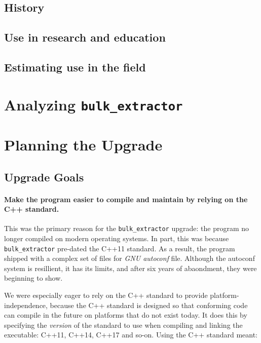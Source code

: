 \documentclass[5p]{elsarticle}
\newcommand{\be}{\texttt{bulk\_extractor}\xspace}
\begin{document}
\subsection{History}
\subsection{Use in research and education}
\subsection{Estimating use in the field}

\section{Analyzing \be}\label{analysis}
\section{Planning the Upgrade}\label{improvement}
\subsection{Upgrade Goals}

\paragraph{Make the program easier to compile and maintain by relying on the
C++ standard.} This was the primary reason for the \be upgrade: the
program no longer compiled on modern operating systems. In part, this
was because \be pre-dated the C++11 standard. As a result, the program
shipped with a complex set of files for \emph{GNU autoconf}
file. Although the autoconf system is resillient, it has its limits,
and after six years of abaondment, they were beginning to show.

We were especially eager to rely on the C++ standard to provide platform-independence, because the
C++ standard is designed so that conforming code can compile in the
future on platforms that do not exist today. It does this by
specifying the \emph{version} of the standard to use when compiling
and linking the executable: C++11, C++14, C++17 and so-on. Using the
C++ standard meant:
\end{document}
